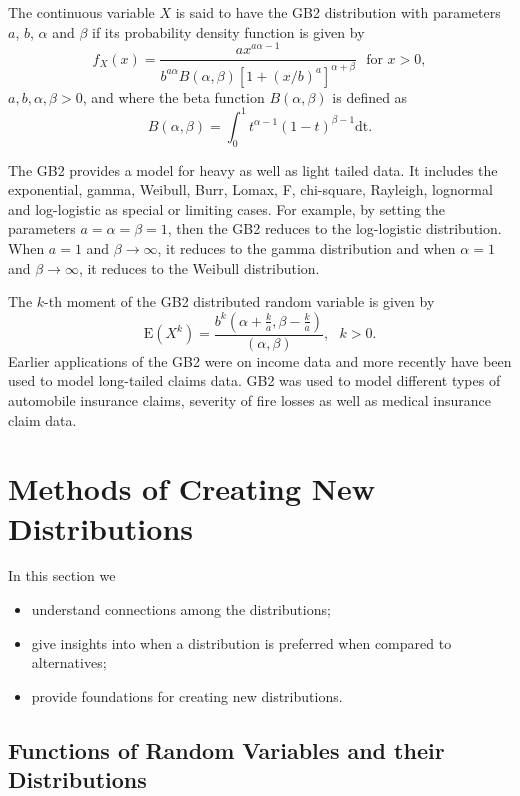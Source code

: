\documentclass[]{book}
\providecommand{\tightlist}{%
  \setlength{\itemsep}{0pt}\setlength{\parskip}{0pt}}
\theoremstyle{definition}
\theoremstyle{definition}
\theoremstyle{definition}
\theoremstyle{remark}
\begin{document}
The continuous variable \(X\) is said to have the GB2 distribution with
parameters \(a\), \(b\), \(\alpha\) and \(\beta\) if its probability
density function is given by
\[f_{X}\left( x \right) = \frac{ax^{a \alpha - 1}}{b^{a \alpha}B\left( \alpha,\beta \right)\left\lbrack 1 + \left( x/b \right)^{a} \right\rbrack^{\alpha + \beta}} \ \ \ \text{for } x > 0,\]
\(a,b,\alpha,\beta > 0\), and where the beta function
\(B\left( \alpha,\beta \right)\) is defined as
\[B\left( \alpha,\beta \right) = \int_{0}^{1}{t^{\alpha - 1}\left( 1 - t \right)^{\beta - 1}}\text{dt}.\]

The GB2 provides a model for heavy as well as light tailed data. It
includes the exponential, gamma, Weibull, Burr, Lomax, F, chi-square,
Rayleigh, lognormal and log-logistic as special or limiting cases. For
example, by setting the parameters \(a = \alpha = \beta = 1\), then the
GB2 reduces to the log-logistic distribution. When \(a = 1\) and
\(\beta \rightarrow \infty\), it reduces to the gamma distribution and
when \(\alpha = 1\) and \(\beta \rightarrow \infty\), it reduces to the
Weibull distribution.

The \(k\)-th moment of the GB2 distributed random variable is given by
\[\mathrm{E}\left( X^{k} \right) = \frac{b^{k}\left( \alpha + \frac{k}{a},\beta - \frac{k}{a} \right)}{\left( \alpha,\beta \right)}, \ \ \ k > 0.\]
Earlier applications of the GB2 were on income data and more recently
have been used to model long-tailed claims data. GB2 was used to model
different types of automobile insurance claims, severity of fire losses
as well as medical insurance claim data.

\section{Methods of Creating New Distributions}\label{MethodsCreation}

In this section we

\begin{itemize}
\tightlist
\item
  understand connections among the distributions;
\item
  give insights into when a distribution is preferred when compared to
  alternatives;
\item
  provide foundations for creating new distributions.
\end{itemize}

\subsection{Functions of Random Variables and their
Distributions}\label{functions-of-random-variables-and-their-distributions}
\end{document}
